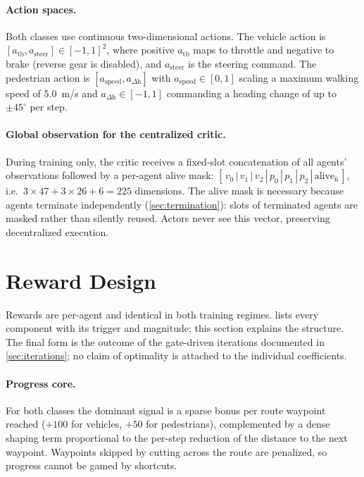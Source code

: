 \paragraph{Action spaces.}
Both classes use continuous two-dimensional actions. The vehicle action is
$[a_{\mathrm{tb}}, a_{\mathrm{steer}}] \in [-1,1]^2$, where positive
$a_{\mathrm{tb}}$ maps to throttle and negative to brake (reverse gear is
disabled), and $a_{\mathrm{steer}}$ is the steering command. The
pedestrian action is $[a_{\mathrm{speed}}, a_{\Delta\mathrm{h}}]$ with
$a_{\mathrm{speed}} \in [0,1]$ scaling a maximum walking speed of
\SI{5.0}{m/s} and $a_{\Delta\mathrm{h}} \in [-1,1]$ commanding a heading
change of up to $\pm 45^{\circ}$ per step.

\paragraph{Global observation for the centralized critic.}
During training only, the critic receives a fixed-slot concatenation of
all agents' observations followed by a per-agent alive mask:
$[\,v_0\,|\,v_1\,|\,v_2\,|\,p_0\,|\,p_1\,|\,p_2\,|\,\text{alive}_{6}\,]$,
i.e.\ $3 \times 47 + 3 \times 26 + 6 = 225$ dimensions. The alive mask is
necessary because agents terminate independently
(\cref{sec:termination}): slots of terminated agents are masked rather
than silently reused. Actors never see this vector, preserving
decentralized execution.

\section{Reward Design}
\label{sec:rewards}

Rewards are per-agent and identical in both training regimes.
 lists every component with its trigger and magnitude;
this section explains the structure. The final form is the outcome of the
gate-driven iterations documented in \cref{sec:iterations}; no claim of
optimality is attached to the individual coefficients.

\paragraph{Progress core.}
For both classes the dominant signal is a sparse bonus per route waypoint
reached ($+100$ for vehicles, $+50$ for pedestrians), complemented by a
dense shaping term proportional to the per-step reduction of the distance
to the next waypoint. Waypoints skipped by cutting across the route are
penalized, so progress cannot be gamed by shortcuts.

